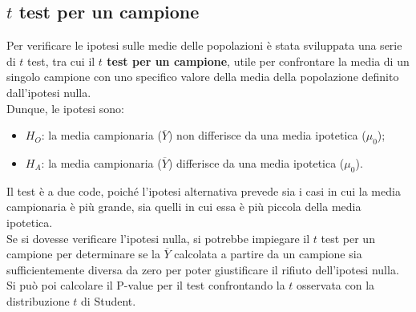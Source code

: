 \documentclass[10pt, draft]{book}
\newcommand{\tightlist}{%
\setlength{\itemsep}{1pt}\setlength{\parskip}{0pt}\setlength{\parsep}{0pt}}
\begin{document}
\subsection{\texorpdfstring{$t$}{Lg} test per un campione}
Per verificare le ipotesi sulle medie delle popolazioni è stata sviluppata una serie di $t$ test, tra cui il \textbf{$t$ test per un campione}, utile per confrontare la media di un singolo campione con uno specifico valore della media della popolazione definito dall'ipotesi nulla.
\\
Dunque, le ipotesi sono:
\begin{itemize} \tightlist
    \item $H_O$: la media campionaria ($\overline{Y}$) non differisce da una media ipotetica ($\mu_0$);
    \item $H_A$: la media campionaria ($\overline{Y}$) differisce da una media ipotetica ($\mu_0$).
\end{itemize}
Il test è a due code, poiché l'ipotesi alternativa prevede sia i casi in cui la media campionaria è più grande, sia quelli in cui essa è più piccola della media ipotetica.
\\
Se si dovesse verificare l'ipotesi nulla, si potrebbe impiegare il $t$ test per un campione per determinare se la $\overline{Y}$ calcolata a partire da un campione sia sufficientemente diversa da zero per poter giustificare il rifiuto dell'ipotesi nulla.
\\
Si può poi calcolare il P-value per il test confrontando la $t$ osservata con la distribuzione $t$ di Student.
\end{document}
